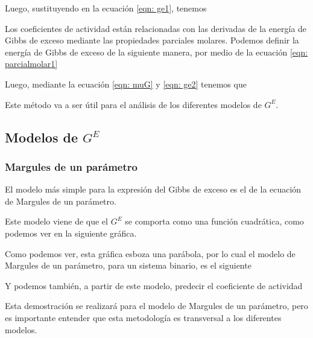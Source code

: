 Luego, sustituyendo en la ecuación \ref{eqn: ge1}, tenemos

Los coeficientes de actividad están relacionadas con las derivadas de la energía de Gibbs de exceso mediante las propiedades parciales molares.
Podemos definir la energía de Gibbs de exceso de la siguiente manera, por medio de la ecuación \ref{eqn: parcialmolar1}

Luego, mediante la ecuación \ref{eqn: muG} y \ref{eqn: ge2} tenemos que


Este método va a ser útil para el análisis de los diferentes modelos de $G^{E}$.
\clearpage
\subsection{Modelos de $G^{E}$}
\subsubsection{Margules de un parámetro}
El modelo más simple para la expresión del Gibbs de exceso es el de la ecuación de Margules de un parámetro.

Este modelo viene de que el $G^{E}$ se comporta como una función cuadrática, como podemos ver en la siguiente gráfica.


Como podemos ver, esta gráfica esboza una parábola, por lo cual el modelo de Margules de un parámetro, para un sistema binario, es el siguiente


Y podemos también, a partir de este modelo, predecir el coeficiente de actividad



Esta demostración se realizará para el modelo de Margules de un parámetro, pero es importante entender que esta metodología 
es transversal a los diferentes modelos.

